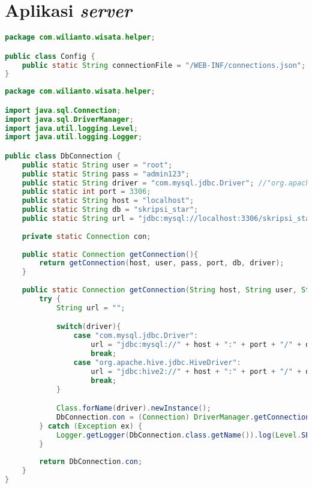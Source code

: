 \section{Aplikasi \textit{server}}
\begin{lstlisting}[language=Java,basicstyle=\tiny,caption=Config.java]
package com.wilianto.wisata.helper;

public class Config {
    public static String connectionFile = "/WEB-INF/connections.json";
}
\end{lstlisting}

\begin{lstlisting}[language=Java,basicstyle=\tiny,caption=DbConnection.java]
package com.wilianto.wisata.helper;

import java.sql.Connection;
import java.sql.DriverManager;
import java.util.logging.Level;
import java.util.logging.Logger;

public class DbConnection {
    public static String user = "root";
    public static String pass = "admin123";
    public static String driver = "com.mysql.jdbc.Driver"; //"org.apache.hive.jdbc.HiveDriver";
    public static int port = 3306;
    public static String host = "localhost";
    public static String db = "skripsi_star";
    public static String url = "jdbc:mysql://localhost:3306/skripsi_star"; //"jdbc:hive2://localhost:10000/default";
    
    private static Connection con;
    
    public static Connection getConnection(){
        return getConnection(host, user, pass, port, db, driver);
    }
    
    public static Connection getConnection(String host, String user, String pass, int port, String db, String driver){
        try {
            String url = "";

            switch(driver){
                case "com.mysql.jdbc.Driver":
                    url = "jdbc:mysql://" + host + ":" + port + "/" + db + "";
                    break;
                case "org.apache.hive.jdbc.HiveDriver":
                    url = "jdbc:hive2://" + host + ":" + port + "/" + db + "";
                    break;
            }

            Class.forName(driver).newInstance();
            DbConnection.con = (Connection) DriverManager.getConnection(url, user, pass);
        } catch (Exception ex) {
            Logger.getLogger(DbConnection.class.getName()).log(Level.SEVERE, null, ex);
        } 
        
        return DbConnection.con;
    }
}
\end{lstlisting}
